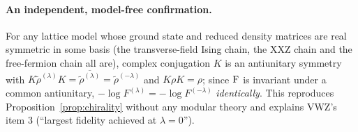 \documentclass[11pt]{article}
\begin{document}
\paragraph{An independent, model-free confirmation.}
For any lattice model whose ground state and reduced density matrices are real symmetric in some
basis (the transverse-field Ising chain, the XXZ chain and the free-fermion chain all are),
complex conjugation $K$ is an antiunitary symmetry with
$K\widetilde\rho^{(\lambda)}K=\overline{\widetilde\rho^{(\lambda)}}=\widetilde\rho^{(-\lambda)}$
and $K\rho K=\rho$; since $\operatorname{F}$ is invariant under a common antiunitary,
$-\log F^{(\lambda)}=-\log F^{(-\lambda)}$ \emph{identically}.  This reproduces
Proposition~\ref{prop:chirality} without any modular theory and explains VWZ's item 3
(``largest fidelity achieved at $\lambda=0$'').
\end{document}
